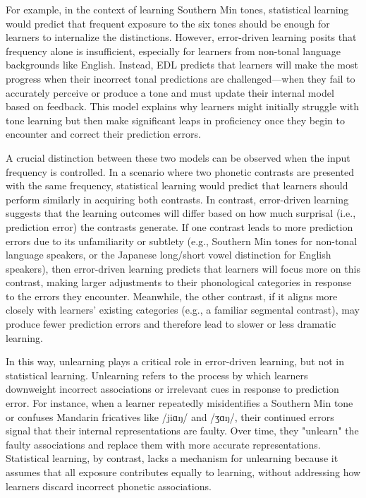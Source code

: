For example, in the context of learning Southern Min tones, statistical learning would predict that frequent exposure to the six tones should be enough for learners to internalize the distinctions. However, error-driven learning posits that frequency alone is insufficient, especially for learners from non-tonal language backgrounds like English. Instead, EDL predicts that learners will make the most progress when their incorrect tonal predictions are challenged—when they fail to accurately perceive or produce a tone and must update their internal model based on feedback. This model explains why learners might initially struggle with tone learning but then make significant leaps in proficiency once they begin to encounter and correct their prediction errors.

A crucial distinction between these two models can be observed when the input frequency is controlled. In a scenario where two phonetic contrasts are presented with the same frequency, statistical learning would predict that learners should perform similarly in acquiring both contrasts. In contrast, error-driven learning suggests that the learning outcomes will differ based on how much surprisal (i.e., prediction error) the contrasts generate. If one contrast leads to more prediction errors due to its unfamiliarity or subtlety (e.g., Southern Min tones for non-tonal language speakers, or the Japanese long/short vowel distinction for English speakers), then error-driven learning predicts that learners will focus more on this contrast, making larger adjustments to their phonological categories in response to the errors they encounter. Meanwhile, the other contrast, if it aligns more closely with learners’ existing categories (e.g., a familiar segmental contrast), may produce fewer prediction errors and therefore lead to slower or less dramatic learning.

In this way, unlearning plays a critical role in error-driven learning, but not in statistical learning. Unlearning refers to the process by which learners downweight incorrect associations or irrelevant cues in response to prediction error. For instance, when a learner repeatedly misidentifies a Southern Min tone or confuses Mandarin fricatives like /jiɑŋ/ and /ʒɑŋ/, their continued errors signal that their internal representations are faulty. Over time, they "unlearn" the faulty associations and replace them with more accurate representations. Statistical learning, by contrast, lacks a mechanism for unlearning because it assumes that all exposure contributes equally to learning, without addressing how learners discard incorrect phonetic associations.

